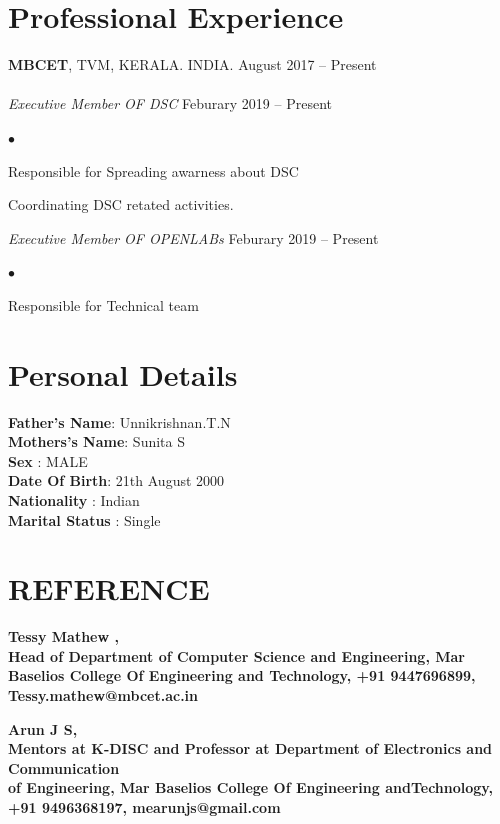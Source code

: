 \documentclass[margin,line]{res}
\newenvironment{list2}{
  \begin{list}{$\bullet$}{%
      \setlength{\itemsep}{0in}
      \setlength{\parsep}{0in} \setlength{\parskip}{0in}
      \setlength{\topsep}{0in} \setlength{\partopsep}{0in}
      \setlength{\leftmargin}{0.2in}}}{\end{list}}
\begin{document}
\begin{resume}
\begin{enumerate}
\end{enumerate}
\section{\sc Professional Experience}
{\bf MBCET}, TVM, KERALA. INDIA. \hfill{August 2017 -- Present}\\
\\

{\em Executive Member  OF DSC }\hfill {Feburary 2019 -- Present}\\
\begin{list2} %
	\item Responsible for Spreading awarness about DSC  \\
	\item Coordinating DSC retated activities.
\end{list2}
{\em Executive Member  OF OPENLABs }\hfill {Feburary 2019 -- Present}\\
\begin{list2} %
	\item Responsible for Technical team  \\
	
\end{list2}
\section{\sc Personal Details}
{\bf Father's Name}: Unnikrishnan.T.N \\
{\bf Mothers's Name}:  Sunita S\\
{\bf Sex}  :  MALE\\
{\bf Date Of Birth}:  21th August 2000\\
{\bf Nationality}       : Indian \\
{\bf Marital Status}       : Single \\



\section{\sc REFERENCE }

\bf Tessy Mathew ,\\ Head of Department of Computer Science and Engineering, Mar Baselios College Of Engineering and Technology, +91 9447696899, Tessy.mathew@mbcet.ac.in


\bf Arun J S,\\ Mentors at K-DISC and
Professor at Department of Electronics and Communication\\ of Engineering, Mar Baselios College Of Engineering andTechnology, +91 9496368197, mearunjs@gmail.com

\end{resume}
\end{document}
